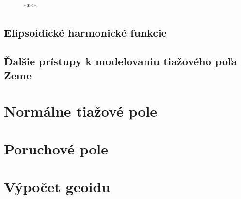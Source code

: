 \documentclass[a4paper, 12pt]{book}
\begin{document}
\begin{figure}
\centering

\caption{****}
\label{fig:spherical_harmonics_convergence}
\end{figure}


\section{Elipsoidické harmonické funkcie}







\section{Ďalšie prístupy k modelovaniu tiažového poľa Zeme}

\chapter{Normálne tiažové pole}
\label{sec:normal_gravity_field}








\chapter{Poruchové pole}
\label{sec:disturbing_field}








\chapter{Výpočet geoidu}
\label{sec:geoid_determination}
\end{document}
